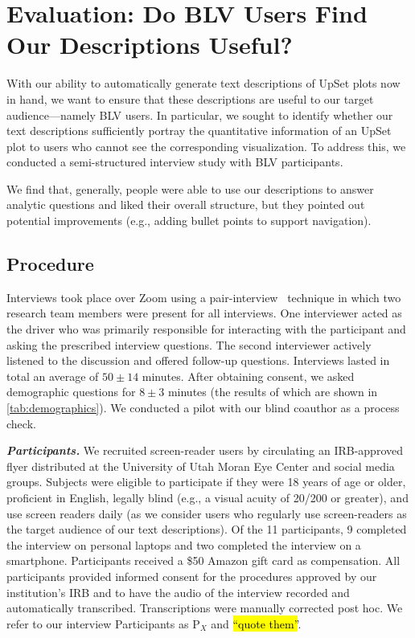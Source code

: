 \documentclass{egpubl}
\newcommand{\eg}{{e.g.,}}
\newcommand{\hlc}[2][yellow]{{\colorlet{foo}{#1}\sethlcolor{foo}\hl{#2}}}
\newcommand\qt[1]{\hlc[quoteColor!20]{``#1''}}
\newcommand{\ix}[1]{P$_{#1}$}
\newcommand{\parahead}[1]
{\vspace{0.25em}\noindent \textbf{\textit{#1.}}}
\begin{document}
\section{Evaluation: Do BLV Users Find Our Descriptions Useful?}
\label{sec:interview}


With our ability to automatically generate text descriptions of UpSet plots now in hand, we want to ensure that these descriptions are useful to our target audience---namely BLV users.
In particular, we sought to identify whether our text descriptions sufficiently portray the quantitative information of an UpSet plot to users who cannot see the corresponding visualization. To address this, we conducted a semi-structured interview study with BLV participants.

We find that, generally, people were able to use our descriptions to answer analytic questions and liked their overall structure, but they pointed out potential improvements (\eg{} adding bullet points to support navigation).

\subsection{Procedure}

Interviews took place over Zoom using a pair-interview~\cite{akbaba_two_2023} technique in which two research team members were present for all interviews.
One interviewer acted as the driver who was primarily responsible for interacting with the participant and asking the prescribed interview questions. The second interviewer actively listened to the discussion and offered follow-up questions.
Interviews lasted in total an average of $50\pm 14$ minutes.
After obtaining consent, we asked demographic questions for $8\pm 3$ minutes (the results of which are shown in \autoref{tab:demographics}). We conducted a pilot with our blind coauthor as a process check.

\parahead{Participants}
We recruited screen-reader users by circulating an IRB-approved flyer distributed at the University of Utah Moran Eye Center and social media groups. Subjects were eligible to participate if they were 18 years of age or older, proficient in English, legally blind (\eg{} a visual acuity of 20/200 or greater), and use screen readers daily (as we consider users who regularly use screen-readers as the target audience of our text descriptions).
Of the 11 participants, 9 completed the interview on personal laptops and two completed the interview on a smartphone.
Participants received a \$50 Amazon gift card as compensation.
All participants provided informed consent for the procedures approved by our institution's IRB and to have the audio of the interview recorded and automatically transcribed. Transcriptions were manually corrected post hoc.
We refer to our interview Participants as \ix{X} and \qt{quote them}.
\end{document}
